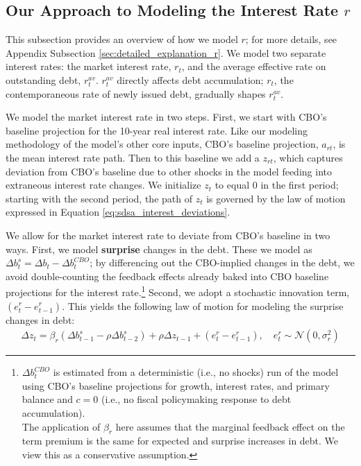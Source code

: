 \documentclass[12pt]{article}
\begin{document}
\subsection{Our Approach to Modeling the Interest Rate $r$}
This subsection provides an overview of how we model $r$; for more details, see Appendix Subsection \ref{sec:detailed_explanation_r}. We model two separate interest rates: the market interest rate, $r_t$, and the average effective rate on outstanding debt, $r^{av}_t$. $r^{av}_t$ directly affects debt accumulation; $r_t$, the contemporaneous rate of newly issued debt, gradually shapes $r^{av}_t$.

We model the market interest rate in two steps. First, we start with CBO's baseline projection for the 10-year real interest rate. Like our modeling methodology of the model's other core inputs, CBO's baseline projection, $a_{rt}$, is the mean interest rate path. Then to this baseline we add a $z_{rt}$, which captures deviation from CBO's baseline due to other shocks in the model feeding into extraneous interest rate changes. We initialize $z_t$ to equal 0 in the first period; starting with the second period, the path of $z_t$ is governed by the law of motion expressed in Equation \ref{eq:sdsa_interest_deviations}. 

We allow for the market interest rate to deviate from CBO's baseline in two ways. First, we model \textbf{surprise} changes in the debt. These we model as $\Delta b^s_t = \Delta b_t - \Delta b^{CBO}_t$; by differencing out the CBO-implied changes in the debt, we avoid double-counting the feedback effects already baked into CBO baseline projections for the interest rate.\footnote{$\Delta b^{CBO}_t$ is estimated from a deterministic (i.e., no shocks) run of the model using CBO's baseline projections for growth, interest rates, and primary balance and $c = 0$ (i.e., no fiscal policymaking response to debt accumulation). \\ The application of $\beta_r$ here assumes that the marginal feedback effect on the term premium is the same for expected and surprise increases in debt. We view this as a conservative assumption.} Second, we adopt a stochastic innovation term, $(e^r_t - e^r_{t-1})$. This yields the following law of motion for modeling the surprise changes in debt:
\begin{gather}
        \Delta z_t = \beta_r (\Delta b^s_{t-1} - \rho \Delta b^s_{t-2}) + \rho \Delta z_{t-1} + (e^r_t - e^r_{t-1}),\quad e^r_t \sim \mathcal{N}(0, \sigma^2_r)
\end{gather}
\end{document}

